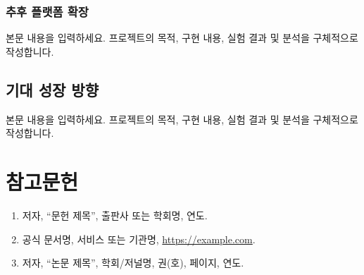 \documentclass[12pt,a4paper,oneside]{report}
\newcommand{\placeholdertext}{%
  본문 내용을 입력하세요. 프로젝트의 목적, 구현 내용, 실험 결과 및 분석을 구체적으로 작성합니다.
}
\begin{document}
\subsection{추후 플랫폼 확장}
\placeholdertext

\section{기대 성장 방향}
\placeholdertext

\chapter{참고문헌}

\begin{enumerate}[leftmargin=2em,label=\arabic*.]
  \item 저자, ``문헌 제목'', 출판사 또는 학회명, 연도.
  \item 공식 문서명, 서비스 또는 기관명, \url{https://example.com}.
  \item 저자, ``논문 제목'', 학회/저널명, 권(호), 페이지, 연도.
\end{enumerate}
\end{document}
